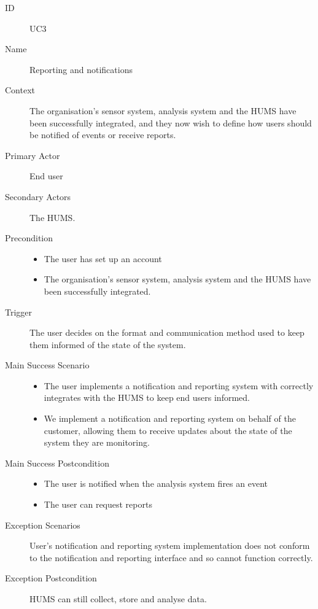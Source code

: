\documentclass[10pt,a4paper]{article}
\begin{document}
\begin{description}
	\item[ID] UC3
	\item[Name] Reporting and notifications
	\item[Context] The organisation's sensor system, analysis system and the HUMS
	               have been successfully integrated, and they now wish to define
	               how users should be notified of events or receive reports.
	\item[Primary Actor] End user
	\item[Secondary Actors] The HUMS.
	\item[Precondition]
			\begin{itemize}
			\item The user has set up an account
			\item The organisation's sensor system, analysis system and the HUMS have
			      been successfully integrated.
			\end{itemize}
	\item[Trigger] The user decides on the format and communication method used
	               to keep them informed of the state of the system.
	\item[Main Success Scenario]
			\begin{itemize}
				\item The user implements a notification and reporting system with
				      correctly integrates with the HUMS to keep end users informed.
				\item We implement a notification and reporting system on behalf of the
				      customer, allowing them to receive updates about the state of the
				      system they are monitoring.
			\end{itemize}
	\item[Main Success Postcondition]
			\begin{itemize}
				\item The user is notified when the analysis system fires an event
				\item The user can request reports
			\end{itemize}
	\item[Exception Scenarios] User's notification and reporting system
			implementation does not conform to the notification and reporting
			interface and so cannot function correctly.
	\item[Exception Postcondition] HUMS can still collect, store and analyse data.
\end{description}
\end{document}
